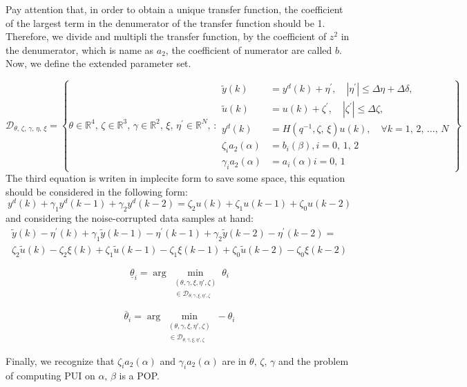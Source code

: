 Pay attention that, in order to obtain a unique transfer function, the coefficient of the largest term in the denumerator of the transfer function should be 1. Therefore, we divide and multipli the transfer function, by the coefficient of $z^2$ in the denumerator, which is name as $a_2$, the coefficient of numerator are called $b$.\\

Now, we define the extended parameter set.

\[
\mathcal{D}_{\theta,\,\zeta,\,\gamma,\,\eta,\,\xi} = \left\{ \theta \in \mathbb{R}^4,\, \zeta \in \mathbb{R}^3,\,\gamma \in \mathbb{R}^2,\,\xi,\,\eta^{'} \in \mathbb{R}^N,\, : 
\begin{aligned}
\tilde{y}(k) &= y^d(k) + \eta^{'} , \quad |\eta^{'}| \leq \Delta\eta + \Delta\delta, \\
\tilde{u}(k) &= u(k) + \zeta^{'} , \quad |\zeta^{'}| \leq \Delta\zeta , \\
y^d(k) &= H(q^{-1},\zeta,\,\xi) u(k), \quad \forall k = 1,\, 2,\, \dots,\, N \\
\zeta_i a_2(\alpha) &= b_i(\beta), i = 0,\, 1,\,2\\
\gamma_i a_2(\alpha) &= a_i(\alpha) i = 0,\,1
\end{aligned}
\right\}
\]
The third equation is writen in implecite form to save some space, this equation should be considered in the following form:
\[
y^d(k) + \gamma_1 y^d(k-1) + \gamma_2 y^d(k-2) = \zeta_2 u(k) + \zeta_1 u(k-1) + \zeta_0 u(k-2)
\]
and considering the noise-corrupted data samples at hand:
\[
\begin{array}{c}
\tilde{y}(k) - \eta^{'}(k) + \gamma_1\tilde{y}(k-1) - \eta^{'}(k-1) + \gamma_2 \tilde{y}(k-2) - \eta^{'}(k-2) = \\ \zeta_2 \tilde{u}(k) - \zeta_2 \xi(k) +\zeta_1 \tilde{u}(k-1) - \zeta_1 \xi(k-1) + \zeta_0 \tilde{u}(k-2) - \zeta_0 \xi(k-2)
\end{array}
\]

\[
\underline{\theta}_i = \arg \min_{\substack{(\theta, \gamma, \xi, \eta', \zeta) \\ \in \mathcal{D}_{\theta, \gamma, \xi, \eta', \zeta}}} \theta_i
\]

\[
\overline{\theta}_i = \arg \min_{\substack{(\theta, \gamma, \xi, \eta', \zeta) \\ \in \mathcal{D}_{\theta, \gamma, \xi, \eta', \zeta}}} -\theta_i
\]

Finally, we recognize that $\zeta_i a_2(\alpha)$ and $\gamma_i a_2(\alpha)$ are in $\theta,\,\zeta,\,\gamma$ and the problem of computing PUI on $\alpha,\,\beta$ is a POP.

